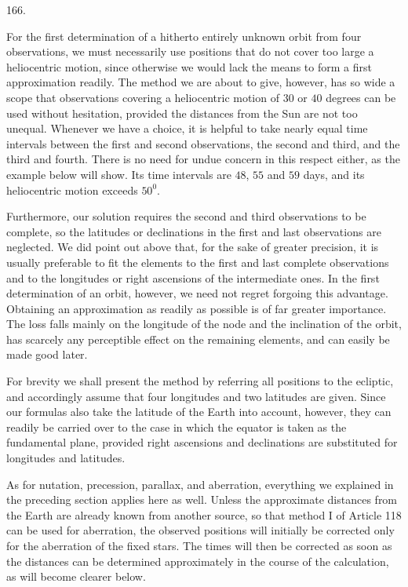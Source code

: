 \begin{center}\hypertarget{native-229-article166}{}166.\end{center}
For the first determination of a hitherto entirely unknown orbit from four observations, we must necessarily use positions that do not cover too large a heliocentric motion, since otherwise we would lack the means to form a first approximation readily. The method we are about to give, however, has so wide a scope that observations covering a heliocentric motion of $30$ or $40$ degrees can be used without hesitation, provided the distances from the Sun are not too unequal. Whenever we have a choice, it is helpful to take nearly equal time intervals between the first and second observations, the second and third, and the third and fourth. There is no need for undue concern in this respect either, as the example below will show. Its time intervals are $48$, $55$ and $59$ days, and its heliocentric motion exceeds $50^0$.

Furthermore, our solution requires the second and third observations to be complete, so the latitudes or declinations in the first and last observations are neglected. We did point out above that, for the sake of greater precision, it is usually preferable to fit the elements to the first and last complete observations and to the longitudes or right ascensions of the intermediate ones. In the first determination of an orbit, however, we need not regret forgoing this advantage. Obtaining an approximation as readily as possible is of far greater importance. The loss falls mainly on the longitude of the node and the inclination of the orbit, has scarcely any perceptible effect on the remaining elements, and can easily be made good later.

For brevity we shall present the method by referring all positions to the ecliptic, and accordingly assume that four longitudes and two latitudes are given. Since our formulas also take the latitude of the Earth into account, however, they can readily be carried over to the case in which the equator is taken as the fundamental plane, provided right ascensions and declinations are substituted for longitudes and latitudes.

As for nutation, precession, parallax, and aberration, everything we explained in the preceding section applies here as well. Unless the approximate distances from the Earth are already known from another source, so that method I of Article 118 can be used for aberration, the observed positions will initially be corrected only for the aberration of the fixed stars. The times will then be corrected as soon as the distances can be determined approximately in the course of the calculation, as will become clearer below.
